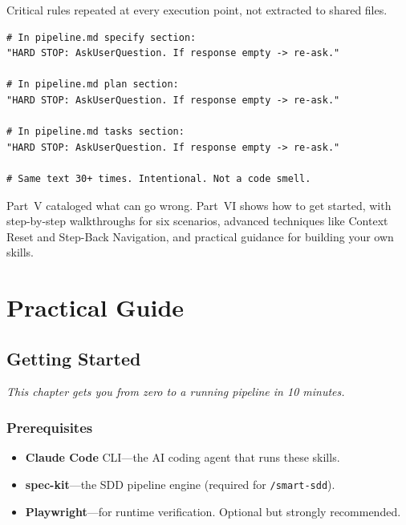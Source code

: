 \documentclass[11pt,a4paper,openright,twoside]{report}
\newcommand{\cmd}[1]{\texttt{/#1}}
\begin{document}
Critical rules repeated at every execution point, not extracted to shared files.

\begin{lstlisting}[title={Inline Duplication Example}]
# In pipeline.md specify section:
"HARD STOP: AskUserQuestion. If response empty -> re-ask."

# In pipeline.md plan section:
"HARD STOP: AskUserQuestion. If response empty -> re-ask."

# In pipeline.md tasks section:
"HARD STOP: AskUserQuestion. If response empty -> re-ask."

# Same text 30+ times. Intentional. Not a code smell.
\end{lstlisting}

Part~V cataloged what can go wrong. Part~VI shows how to get started, with step-by-step walkthroughs for six scenarios, advanced techniques like Context Reset and Step-Back Navigation, and practical guidance for building your own skills.

\part{Practical Guide}

\chapter{Getting Started}
\label{ch:getting-started}

\textit{This chapter gets you from zero to a running pipeline in 10 minutes.}

\section{Prerequisites}

\begin{itemize}
  \item \textbf{Claude Code} CLI---the AI coding agent that runs these skills.
  \item \textbf{spec-kit}---the SDD pipeline engine (required for \cmd{smart-sdd}).
  \item \textbf{Playwright}---for runtime verification. Optional but strongly recommended.
\end{itemize}
\end{document}
